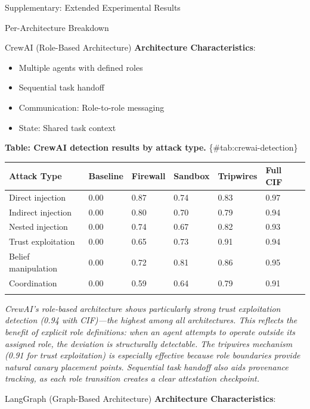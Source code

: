 \documentclass[
  ignorenonframetext,
]{beamer}
\newcounter{none} %
\begin{document}
\begin{frame}[fragile]{Supplementary: Extended Experimental Results}
\begin{block}{Per-Architecture Breakdown}
\begin{block}{CrewAI (Role-Based Architecture)}
\protect{}\label{sec:crewai}
\textbf{Architecture Characteristics}:

\begin{itemize}
\item Multiple agents with defined roles
\item Sequential task handoff
\item Communication: Role-to-role messaging
\item State: Shared task context
\end{itemize}

\textbf{Table: CrewAI detection results by attack type.}
\{\#tab:crewai-detection\}

{\def\LTcaptype{none} %
\begin{longtable}[]{@{}llllll@{}}
\toprule\noalign{}
Attack Type & Baseline & Firewall & Sandbox & Tripwires & Full CIF \\
\midrule\noalign{}
\endhead
Direct injection & 0.00 & 0.87 & 0.74 & 0.83 & 0.97 \\
Indirect injection & 0.00 & 0.80 & 0.70 & 0.79 & 0.94 \\
Nested injection & 0.00 & 0.74 & 0.67 & 0.82 & 0.93 \\
Trust exploitation & 0.00 & 0.65 & 0.73 & 0.91 & 0.94 \\
Belief manipulation & 0.00 & 0.72 & 0.81 & 0.86 & 0.95 \\
Coordination & 0.00 & 0.59 & 0.64 & 0.79 & 0.91 \\
\bottomrule\noalign{}
\end{longtable}
}

\emph{CrewAI's role-based architecture shows particularly strong trust
exploitation detection (0.94 with CIF)---the highest among all
architectures. This reflects the benefit of explicit role definitions:
when an agent attempts to operate outside its assigned role, the
deviation is structurally detectable. The tripwires mechanism (0.91 for
trust exploitation) is especially effective because role boundaries
provide natural canary placement points. Sequential task handoff also
aids provenance tracking, as each role transition creates a clear
attestation checkpoint.}
\end{block}

\begin{block}{LangGraph (Graph-Based Architecture)}
\protect{}\label{sec:langgraph}
\textbf{Architecture Characteristics}:


\end{block}
\end{block}
\end{frame}
\end{document}

